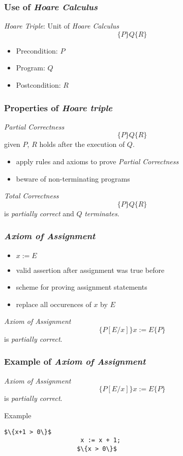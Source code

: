 \documentclass{beamer}
\begin{document}
		\begin{frame}
			\frametitle{Use of \emph{Hoare Calculus}}
			\begin{block}{\emph{Hoare Triple}: Unit of \emph{Hoare Calculus}}
				$$\{P\}Q\{R\}$$
				\begin{itemize}
					\item Precondition: $P$
					\item Program: $Q$
					\item Postcondition: $R$
				\end{itemize}
			\end{block}
		\end{frame}

		\begin{frame}
			\frametitle{Properties of \emph{Hoare triple}}
			\begin{block}{\emph{Partial Correctness}}
				$$\{P\}Q\{R\}$$
				given $P$, $R$ holds after the execution of $Q$.
			\end{block}
			\begin{itemize}
				\item apply rules and axioms to prove \emph{Partial Correctness}
				\item beware of non-terminating programs
			\end{itemize}
			\begin{block}{\emph{Total Correctness}}
				$$\{P\}Q\{R\}$$
				is \emph{partially correct} and $Q$ \emph{terminates}.
			\end{block}
		\end{frame}

		\begin{frame}
			\frametitle{\emph{Axiom of Assignment}}
			\begin{itemize}
				\item $x := E$
				\item valid assertion after assignment was true before
				\item scheme for proving assignment statements
				\item replace all occurences of $x$ by $E$
			\end{itemize}
			\begin{block}{\emph{Axiom of Assignment}}
				$$\{P[E/x]\}x := E\{P\}$$
				is \emph{partially correct}.
			\end{block}
		\end{frame}

		\begin{frame}[fragile]
			\frametitle{Example of \emph{Axiom of Assignment}}
			\begin{block}{\emph{Axiom of Assignment}}
				$$\{P[E/x]\}x := E\{P\}$$
				is \emph{partially correct}.
			\end{block}
			\begin{exampleblock}{Example}
				\begin{lstlisting}[mathescape]
					$\{x+1 > 0\}$
					 x := x + 1;
					$\{x > 0\}$
				\end{lstlisting}
			\end{exampleblock}
		\end{frame}
\end{document}
